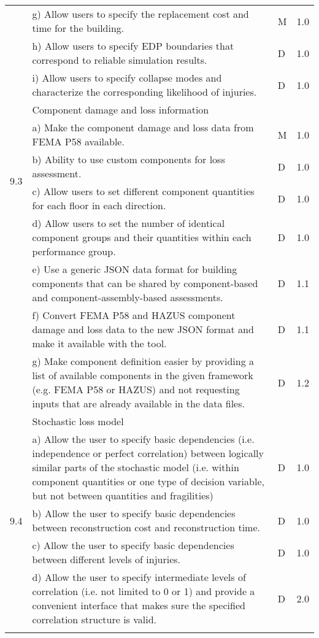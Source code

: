 \begin{longtable}{| p{} | p{} | p{} | p{} |}
{     & g) Allow users to specify the replacement cost and time for the building. & M & 1.0 \\
     & h) Allow users to specify EDP boundaries that correspond to reliable simulation results. & D & 1.0\\
     & i) Allow users to specify collapse modes and characterize the corresponding likelihood of injuries. & D & 1.0\\ \hline
	\multirow{5}{*}{9.3} & Component damage and loss information & & \\
	 & a) Make the component damage and loss data from FEMA P58 available. & M & 1.0 \\
	 & b) Ability to use custom components for loss assessment. & D & 1.0 \\
	 & c) Allow users to set different component quantities for each floor in each direction. & D & 1.0 \\
	 & d) Allow users to set the number of identical component groups and their quantities within each performance group. & D & 1.0 \\
     & e) Use a generic JSON data format for building components that can be shared by component-based and component-assembly-based assessments. & D & 1.1 \\
	 & f) Convert FEMA P58 and HAZUS component damage and loss data to the new JSON format and make it available with the tool. & D & 1.1 \\
	 & g) Make component definition easier by providing a list of available components in the given framework (e.g. FEMA P58 or HAZUS) and not requesting inputs that are already available in the data files. & D & 1.2 \\ \hline
	 \multirow{5}{*}{9.4} & Stochastic loss model & & \\
	 & a) Allow the user to specify basic dependencies (i.e. independence or perfect correlation) between logically similar parts of the stochastic model (i.e. within component quantities or one type of decision variable, but not between quantities and fragilities) & D & 1.0 \\
	 & b) Allow the user to specify basic dependencies between reconstruction cost and reconstruction time. & D & 1.0 \\
	 & c) Allow the user to specify basic dependencies between different levels of injuries. & D & 1.0 \\
	 & d) Allow the user to specify intermediate levels of correlation (i.e. not limited to 0 or 1) and provide a convenient interface that makes sure the specified correlation structure is valid. & D & 2.0 \\ \hline    
}
\end{longtable}
